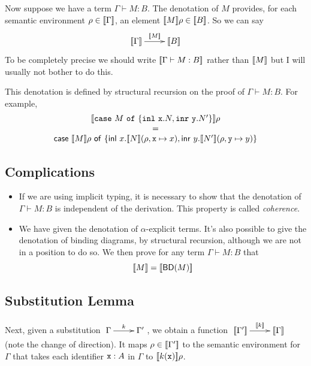 \documentclass[runningheads,12pt]{llncs}
\newcommand{\bd}[1]{\mathsf{BD}({#1})}
\begin{document}
Now suppose we have a term $\Gamma \vdash M : B$.  The denotation of $M$ provides, for each semantic environment $\rho \in [\![ {\Gamma} ]\!]$, an element $[\![ {M} ]\!]\rho \in [\![ {B} ]\!]$.  So we can say
\begin{displaymath}
  \amorphism{\seman{M}}{\seman{\Gamma}}{\seman{B}}
\end{displaymath}
To be completely precise we should write $[\![ {\Gamma \vdash M : B} ]\!]$ rather than $[\![ {M} ]\!]$ but I will usually not bother to do this.  

This denotation is defined by structural recursion on the proof of $\Gamma \vdash M : B$.  For example,
\begin{displaymath}
\begin{array}{c}
  \seman{\ttcase M \ttof \{\tttagl{\ttx}. N, \tttagr{\tty}. N' \} }\rho \\ = \\  \itcase \seman{M}\rho \itof \{ \ittagl{x}.\seman{N}(\rho, \ttx \mapsto x), \ittagr{y}.\seman{N'}(\rho, \tty \mapsto y) \}
\end{array}
\end{displaymath}


\subsection{Complications}


\begin{itemize}
\item If we are using implicit typing, it is necessary to show that the denotation of $\Gamma \vdash M : B$ is independent of the derivation.  This property is called \emph{coherence}.
\item We have given the denotation of $\alpha$-explicit terms.  It's also possible to give the denotation of binding diagrams, by structural recursion, although we are not in a position to do so.  We then prove for any term $\Gamma \vdash M  :B $ that 
  \begin{displaymath}
    \seman{M} = \seman{\bd{M}}
  \end{displaymath}
\end{itemize}


\subsection{Substitution Lemma}

Next, given a substitution $\amorphism{k}{\Gamma}{\Gamma'}$, we obtain a function $\amorphism{\seman{k}}{\seman{\Gamma'}}{\seman{\Gamma}}$ (note the change of direction).  It maps $\rho \in [\![ {\Gamma'} ]\!]$ to the semantic environment for $\Gamma$ that takes each identifier $\mathtt{x}:A$ in $\Gamma$ to $[\![ {k(\mathtt{x})} ]\!]\rho$.
\end{document}
